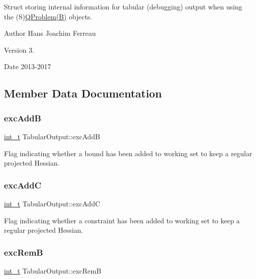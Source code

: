 Struct storing internal information for tabular (debugging) output when using the (S)\hyperlink{class_q_problem}{Q\+Problem(\+B)} objects.

\begin{DoxyAuthor}{Author}
Hans Joachim Ferreau 
\end{DoxyAuthor}
\begin{DoxyVersion}{Version}
3. 
\end{DoxyVersion}
\begin{DoxyDate}{Date}
2013-\/2017 
\end{DoxyDate}


\subsection{Member Data Documentation}
\mbox{\label{struct_tabular_output_a7b5eddade4403020d5087c4e169997a8}} 
\subsubsection{\texorpdfstring{exc\+AddB}{excAddB}}
{\footnotesize\ttfamily \hyperlink{_types_8hpp_ab6fd6105e64ed14a0c9281326f05e623}{int\+\_\+t} Tabular\+Output\+::exc\+AddB}

Flag indicating whether a bound has been added to working set to keep a regular projected Hessian. \mbox{\label{struct_tabular_output_a9a56015fb12f62feefb9fed186a208c1}} 
\subsubsection{\texorpdfstring{exc\+AddC}{excAddC}}
{\footnotesize\ttfamily \hyperlink{_types_8hpp_ab6fd6105e64ed14a0c9281326f05e623}{int\+\_\+t} Tabular\+Output\+::exc\+AddC}

Flag indicating whether a constraint has been added to working set to keep a regular projected Hessian. \mbox{\label{struct_tabular_output_a54378121ea086ea273c8c75c24d6f2e0}} 
\subsubsection{\texorpdfstring{exc\+RemB}{excRemB}}
{\footnotesize\ttfamily \hyperlink{_types_8hpp_ab6fd6105e64ed14a0c9281326f05e623}{int\+\_\+t} Tabular\+Output\+::exc\+RemB}

